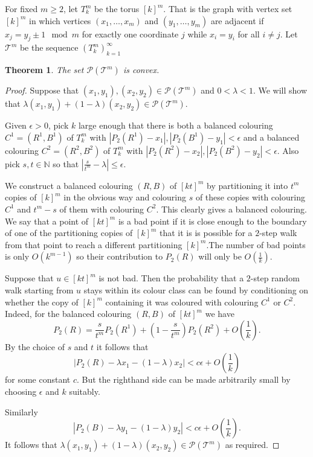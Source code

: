 \documentclass[12pt,a4paper]{article}
\newcommand{\N}{\mathbb N}
\newcommand{\T}{\mathcal T}
\newcommand{\Pcal}{\mathcal P}
\newtheorem{thm}{Theorem}
\begin{document}
For fixed $m\geq 2$, let $T^m_k$ be the torus $[k]^m$. That is the graph with vertex set $[k]^m$ in which vertices $(x_1,\ldots,x_m)$ and $(y_1,\ldots,y_m)$ are adjacent if $x_j=y_j \pm 1\mod m$ for exactly one coordinate $j$ while $x_i=y_i$ for all $i\not=j$. Let $\T^m$ be the sequence $(T^m_k)_{k=1}^{\infty}$


\begin{thm}\label{convex:thm}
The set $\Pcal(\T^m)$ is convex.
\end{thm}

\begin{proof}
Suppose that $(x_1,y_1), (x_2,y_2)\in \Pcal(\T^m)$ and $0<\lambda<1$. We will show that $\lambda(x_1,y_1)+(1-\lambda)(x_2,y_2)\in \Pcal(\T^m)$.

Given $\epsilon>0$, pick $k$ large enough that there is both a balanced colouring $C^1=(R^1,B^1)$ of $T^m_k$ with $|P_2(R^1)-x_1|,|P_2(B^1)-y_1|<\epsilon$ and a balanced colouring $C^2=(R^2,B^2)$ of $T^m_k$ with $|P_2(R^2)-x_2|,|P_2(B^2)-y_2|<\epsilon$. Also pick $s,t\in\N$ so that $|\frac{s}{t^m}-\lambda|\leq\epsilon$. 

We construct a balanced colouring $(R,B)$ of $[kt]^m$ by partitioning it into $t^m$ copies of $[k]^m$ in the obvious way and colouring $s$ of these copies with colouring $C^1$ and $t^m-s$ of them with colouring $C^2$. This clearly gives a balanced colouring. We say that a point of $[kt]^m$ is a bad point if it is close enough to the boundary of one of the partitioning copies of $[k]^m$ that it is is possible for a $2$-step walk from that point to reach a different partitioning $[k]^m$.The number of bad points is only $O(k^{m-1})$ so their contribution to $P_2(R)$ will only be $O(\frac{1}{k})$.

Suppose that $u\in[kt]^m$ is not bad. Then the probability that a $2$-step random walk starting from $u$ stays within its colour class can be found by conditioning on whether the copy of $[k]^m$ containing it was coloured with colouring $C^1$ or $C^2$. Indeed, for the balanced colouring $(R,B)$ of $[kt]^m$ we have
\[
P_2(R)=\frac{s}{t^m}P_2(R^1)+\left(1-\frac{s}{t^m}\right)P_2(R^2)+O\left(\frac{1}{k}\right).
\]
By the choice of $s$ and $t$ it follows that
\[
|P_2(R)-\lambda x_1-(1-\lambda)x_2|<c\epsilon+O\left(\frac{1}{k}\right)
\]
for some constant $c$. But the righthand side can be made arbitrarily small by choosing $\epsilon$ and $k$ suitably. 

Similarly
\[
|P_2(B)-\lambda y_1-(1-\lambda)y_2|<c\epsilon+O\left(\frac{1}{k}\right).
\]
It follows that $\lambda(x_1,y_1)+(1-\lambda)(x_2,y_2)\in \Pcal(\T^m)$ as required.
\end{proof}
\end{document}
